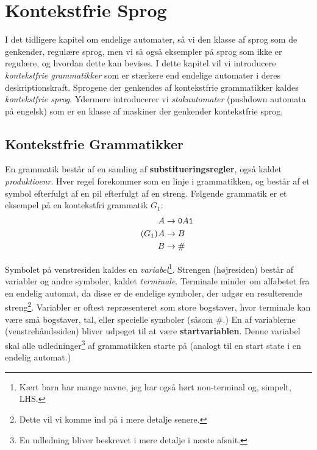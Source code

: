 \chapter{Kontekstfrie Sprog}

I det tidligere kapitel om endelige automater, så vi den klasse af sprog som de genkender, regulære sprog, men vi så også eksempler på sprog som ikke er regulære, og hvordan dette kan bevises. I dette kapitel vil vi introducere \textit{kontekstfrie grammatikker} som er stærkere end endelige automater i deres deskriptionskraft. Sprogene der genkendes af kontekstfrie grammatikker kaldes \textit{kontekstfrie sprog}. Ydermere introducerer vi \textit{stakautomater} (pushdown automata på engelsk) som er en klasse af maskiner der genkender kontekstfrie sprog.

\section{Kontekstfrie Grammatikker}
En grammatik består af en samling af \textbf{substitueringsregler}, også kaldet \textit{produktioenr}. Hver regel forekommer som en linje i grammatikken,  og består af et symbol efterfulgt af en pil efterfulgt af en streng. Følgende grammatik er et eksempel på en kontekstfri grammatik $G_{1}$:
\begin{equation}
  \tag{$G_{1}$}
  \begin{split}
  A &\rightarrow \mathtt{0}A \mathtt{1}\\
  A &\rightarrow B\\
  B &\rightarrow \mathtt{\#}
\end{split}
  \label{eqn:G1}
\end{equation}

Symbolet på venstresiden kaldes en \textit{variabel}\footnote{Kært barn har mange navne, jeg har også hørt non-terminal og, simpelt, LHS.}. Strengen (højresiden) består af variabler og andre symboler, kaldet \textit{terminale}. Terminale minder om alfabetet fra en endelig automat, da disse er de endelige symboler, der udgør en resulterende streng\footnote{Dette vil vi komme ind på i mere detalje senere.}. Variabler er oftest repræsenteret som store bogstaver, hvor terminale kan være små bogstaver, tal, eller specielle symboler (såsom \#.) En af variablerne (venstrehåndssiden) bliver udpeget til at være \textbf{startvariablen}. Denne variabel skal alle udledninger\footnote{En udledning bliver beskrevet i mere detalje i næste afsnit.} af grammatikken starte på (analogt til en start state i en endelig automat.)

